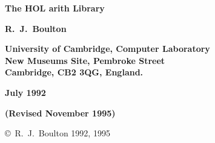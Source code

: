 
\begin{titlepage}

\setcounter{page}{1}		          %


\mbox{}
\vskip20mm
\begin{center}
{\Huge\bf The HOL arith Library}
\end{center}


\vskip15mm
\begin{center}
\large\bf R.\ J.\ Boulton
\end{center}


\vfill
\begin{center}
\bf
University of Cambridge, Computer Laboratory\\
New Museums Site, Pembroke Street\\
Cambridge, {\small\bf CB}2 3{\small\bf QG}, England.
\end{center}


\vskip5mm
\begin{center}
\bf July 1992
\end{center}
\begin{center}
\bf (Revised November 1995)
\end{center}

\end{titlepage}

\thispagestyle{empty}
\mbox{}

\vfill
\begin{center}
\copyright\ R.\ J.\ Boulton 1992, 1995
\end{center}
\newpage
